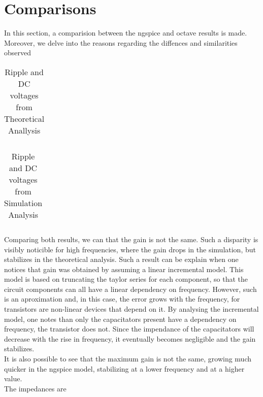 \section{Comparisons}
\label{sec:comparsisons}

In this section, a comparision between the ngspice and octave results is made. Moreover, we delve into the reasons regarding the diffences and similarities observed\\
[insert graphs side by side]

\FloatBarrier
\begin{table}[h]
  \centering
  \begin{tabular}{|c|c|c|c|c|c|c|}
    \hline    
    
    \hline
  \end{tabular}
  \caption{Ripple and DC voltages from Theoretical Anallysis}
  \label{tab:Octave}
\end{table}
\FloatBarrier 

\FloatBarrier
\begin{table}[h]
  \centering
  \begin{tabular}{|c|c|c|}
    \hline    
    
    \hline
  \end{tabular}
  \caption{Ripple and DC voltages from Simulation Analysis}
  \label{tab:Octave}
\end{table}
\FloatBarrier 

Comparing both results, we can that the gain is not the same. Such a disparity is visibly noticible for high frequencies, where the gain drops in the simulation, but stabilizes in the theoretical analysis. Such a result can be explain when one notices that gain was obtained by assuming a linear incremental model. This model is based on truncating the taylor series for each component, so that the circuit components can all have a linear dependency on frequency. However, such is an aproximation and, in this case, the error grows with the frequency, for transistors are non-linear devices that depend on it. By analysing the incremental model, one notes than only the capacitators present have a dependency on frequency, the transistor does not. Since the impendance of the capacitators will decrease with the rise in frequency, it eventually becomes negligible and the gain stabilizes.\\
It is also possible to see that the maximum gain is not the same, growing much quicker in the ngspice model, stabilizing at a lower frequency and at a higher value.\\
The impedances are 





